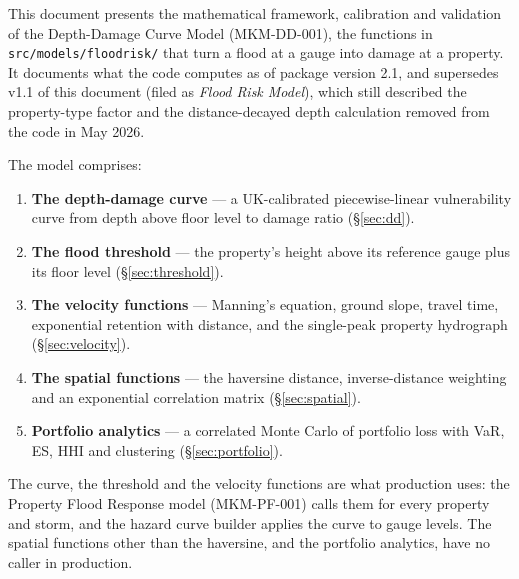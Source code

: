 \documentclass[11pt,a4paper]{article}
\begin{document}
\sloppy

\mkmtitlepage
\mkmlegalpage

\tableofcontents
\clearpage

\mkmexecsummary

This document presents the mathematical framework, calibration and validation of the
Depth-Damage Curve Model (MKM-DD-001), the functions in \texttt{src/models/floodrisk/}
that turn a flood at a gauge into damage at a property. It documents what the code
computes as of package version 2.1, and supersedes v1.1 of this document (filed as
\emph{Flood Risk Model}), which still described the property-type factor and the
distance-decayed depth calculation removed from the code in May 2026.

The model comprises:
\begin{enumerate}[nosep]
    \item \textbf{The depth-damage curve} --- a UK-calibrated piecewise-linear
          vulnerability curve from depth above floor level to damage ratio (\S\ref{sec:dd}).
    \item \textbf{The flood threshold} --- the property's height above its reference gauge
          plus its floor level (\S\ref{sec:threshold}).
    \item \textbf{The velocity functions} --- Manning's equation, ground slope, travel time,
          exponential retention with distance, and the single-peak property hydrograph
          (\S\ref{sec:velocity}).
    \item \textbf{The spatial functions} --- the haversine distance, inverse-distance
          weighting and an exponential correlation matrix (\S\ref{sec:spatial}).
    \item \textbf{Portfolio analytics} --- a correlated Monte Carlo of portfolio loss with
          VaR, ES, HHI and clustering (\S\ref{sec:portfolio}).
\end{enumerate}

\noindent The curve, the threshold and the velocity functions are what production uses:
the Property Flood Response model (MKM-PF-001) calls them for every property and storm,
and the hazard curve builder applies the curve to gauge levels. The spatial functions
other than the haversine, and the portfolio analytics, have no caller in production.
\end{document}
